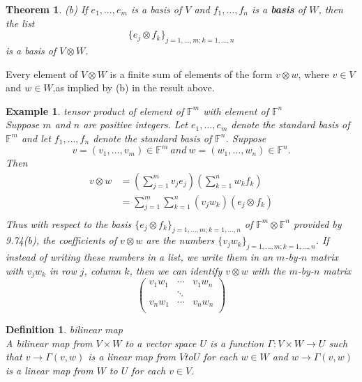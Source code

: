 \documentclass{article}
\newtheorem{theorem}{Theorem}[subsection]
\newtheorem{example}{Example}[subsection]
\newtheorem{definition}{Definition}[subsection]
\newcommand{\FF}{\mathbb{F}}
\newcommand{\parameter}[1]{\left(#1\right)}
\begin{document}
\begin{CJK}{UTF8}{gkai}
\begin{theorem}
    (b) If $e_1,\ldots,e_m$ is a basis of $V$ and $f_1,\ldots, f_n$ is a \textbf{basis} of $W$, then the list
    \[\{e_j \otimes f_k\}_{j=1,\ldots,m;k=1,\ldots,n}\]
    is a basis of $V\otimes W$.
\end{theorem}

Every element of $V\otimes W$ is a finite sum of elements of the form $v \otimes w$, where $v \in V$ and $w\in W$,as implied by (b) in the result above.\\

\begin{example}
    tensor product of element of $\FF^m$ with element of $\FF^n$\\

    Suppose $m$ and $n$ are positive integers. Let $e_1,\ldots,e_m$ denote the standard basis of $\FF^m$ and let $f_1,\ldots, f_n$ denote the standard basis of $\FF^n$. Suppose
    \[v =(v_1,\ldots,v_m) \in \FF^m ~and~ w=(w_1,\ldots,w_n) \in \FF^n.\]
    Then
    \[
        \begin{aligned}
            v \otimes w &= \parameter{\sum_{j = 1}^{m} v_j e_j} \parameter{\sum_{k = 1}^{n} w_k f_k }\\
            &= \sum_{j = 1}^{m} \sum_{k = 1}^{n} (v_j w_k) (e_j\otimes f_k)\\
        \end{aligned}
    \]
    Thus with respect to the basis $\{e_j \otimes f_k\}_{j=1,\ldots,m;k=1,\ldots,n}$ of $\FF^m \otimes \FF^n$ provided
    by 9.74(b), the coefficients of $v \otimes w$ are the numbers $\{v_j w_k\}_{j=1,\ldots,m;k=1,\ldots,n}$. If instead of writing these numbers in a list, we write them in an $m$-by-$n$ matrix with $v_j w_k$ in row $j$, column $k$, then we can identify $v \otimes w$ with the $m$-by-$n$ matrix
    \[\begin{pmatrix}
        v_1 w_1 &\cdots&v_1w_n\\
        &\ddots&\\
        v_n w_1 & \cdots &v_n w_n\\
    \end{pmatrix}\]
\end{example}

\begin{definition}
    bilinear map\\

    A bilinear map from $V \times W$ to a vector space $U$ is a function $\Gamma: V\times W \to U$ such that $v \to \Gamma(v,w)$ is a linear map from $V to U$ for each $w \in W$ and $w \to\Gamma(v,w)$ is a linear map from $W$ to $U$ for each $v \in V$.
\end{definition}


\end{CJK}
\end{document}
